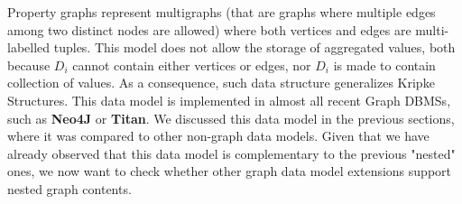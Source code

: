 Property graphs represent multigraphs (that are graphs where multiple edges among two distinct nodes are allowed) where both vertices and edges are multi-labelled tuples. This model does not allow the storage of aggregated values, both because $D_i$ cannot contain either vertices or edges, nor $D_i$ is made to contain collection of values. As a consequence, such data structure generalizes Kripke Structures.  This data model is implemented in almost all recent  Graph DBMSs, such as \textbf{Neo4J} \cite{Robinson} or \textbf{Titan}. We discussed this data model in the previous sections, where it was compared to other non-graph data models. Given that we have already observed that this data model is complementary to the previous "nested" ones, we now want to check whether other graph data model extensions support nested graph contents.



